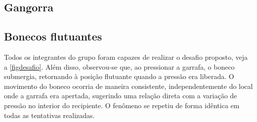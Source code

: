 \subsection{Gangorra}


\subsection{Bonecos flutuantes}

Todos os integrantes do grupo foram capazes de realizar o desafio proposto, veja
a \cref{figdesafio}. Além disso, observou-se que, ao pressionar a garrafa, o
boneco submergia, retornando à posição flutuante quando a pressão era liberada.
O movimento do boneco ocorria de maneira consistente, independentemente do local
onde a garrafa era apertada, sugerindo uma relação direta com a variação de
pressão no interior do recipiente. O fenômeno se repetiu de forma idêntica em
todas as tentativas realizadas.


